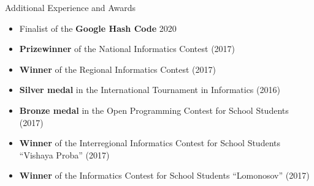 \documentclass[]{cv/mcdowellcv}
\begin{document}
	\begin{cvsection}{Additional Experience and Awards}
            \vskip 0.1cm
		\begin{cvsubsection}{}{}{}
			\begin{itemize}
                            \item Finalist of the \textbf{Google Hash Code} 2020
                            \item \textbf{Prizewinner} of the National Informatics Contest (2017)
                            \item \textbf{Winner} of the Regional Informatics Contest (2017)
                            \item \textbf{Silver medal} in the International Tournament in Informatics (2016)
                            \item \textbf{Bronze medal} in the Open Programming Contest for School Students (2017)
                            \item \textbf{Winner} of the Interregional Informatics Contest for School Students ``Vishaya Proba'' (2017)
                            \item \textbf{Winner} of the Informatics Contest for School Students ``Lomonosov'' (2017)
			\end{itemize}
		\end{cvsubsection}
	\end{cvsection}

\end{document}
